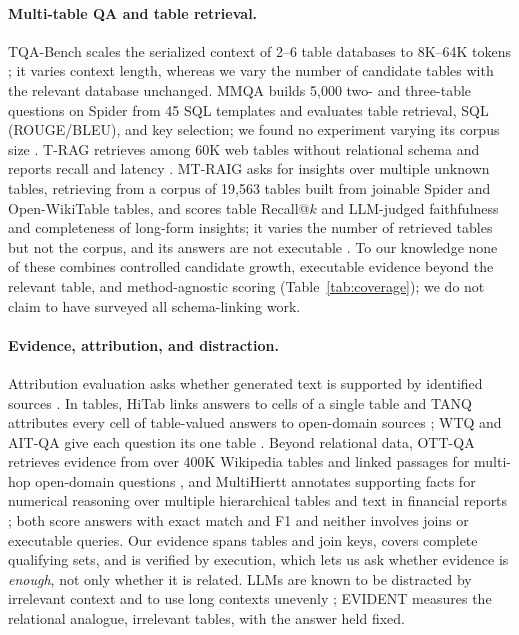 \documentclass[11pt]{article}
\newcommand{\benchmark}{\mbox{EVIDENT}}  %
\begin{document}
\paragraph{Multi-table QA and table retrieval.} TQA-Bench scales the serialized context of 2--6 table databases to 8K--64K tokens \citep{tqabench}; it varies context length, whereas we vary the number of candidate tables with the relevant database unchanged. MMQA builds 5{,}000 two- and three-table questions on Spider from 45 SQL templates and evaluates table retrieval, SQL (ROUGE/BLEU), and key selection; we found no experiment varying its corpus size \citep{mmqa}. T-RAG retrieves among 60K web tables without relational schema and reports recall and latency \citep{trag}. MT-RAIG asks for insights over multiple unknown tables, retrieving from a corpus of 19{,}563 tables built from joinable Spider and Open-WikiTable tables, and scores table Recall@$k$ and LLM-judged faithfulness and completeness of long-form insights; it varies the number of retrieved tables but not the corpus, and its answers are not executable \citep{mtraig}. To our knowledge none of these combines controlled candidate growth, executable evidence beyond the relevant table, and method-agnostic scoring (Table~\ref{tab:coverage}); we do not claim to have surveyed all schema-linking work.

\paragraph{Evidence, attribution, and distraction.} Attribution evaluation asks whether generated text is supported by identified sources \citep{ais,alce}. In tables, HiTab links answers to cells of a single table \citep{hitab} and TANQ attributes every cell of table-valued answers to open-domain sources \citep{tanq}; WTQ and AIT-QA give each question its one table \citep{wtq,aitqa}. Beyond relational data, OTT-QA retrieves evidence from over 400K Wikipedia tables and linked passages for multi-hop open-domain questions \citep{ottqa}, and MultiHiertt annotates supporting facts for numerical reasoning over multiple hierarchical tables and text in financial reports \citep{multihiertt}; both score answers with exact match and F1 and neither involves joins or executable queries. Our evidence spans tables and join keys, covers complete qualifying sets, and is verified by execution, which lets us ask whether evidence is \emph{enough}, not only whether it is related. LLMs are known to be distracted by irrelevant context \citep{distracted} and to use long contexts unevenly \citep{lostmiddle}; \benchmark{} measures the relational analogue, irrelevant tables, with the answer held fixed.
\end{document}

